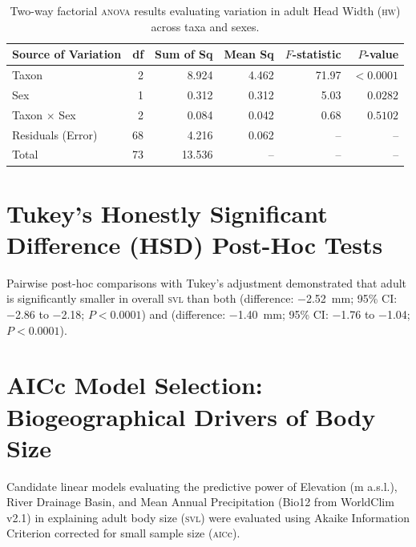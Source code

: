 \begin{table}[htbp]
  \centering
  \small
  \caption{Two-way factorial \textsc{anova} results evaluating variation in adult Head Width (\textsc{hw}) across taxa and sexes.}
  \label{tab:anova_hw}
  \begin{tabular}{lrrrrr}
    \toprule
    \textbf{Source of Variation} & \textbf{df} & \textbf{Sum of Sq} & \textbf{Mean Sq} & \textbf{$F$-statistic} & \textbf{$P$-value} \\
    \midrule
    Taxon & 2 & 8.924 & 4.462 & 71.97 & $< 0.0001$ \\
    Sex & 1 & 0.312 & 0.312 & 5.03 & $0.0282$ \\
    Taxon $\times$ Sex & 2 & 0.084 & 0.042 & 0.68 & $0.5102$ \\
    Residuals (Error) & 68 & 4.216 & 0.062 & -- & -- \\
    \midrule
    Total & 73 & 13.536 & -- & -- & -- \\
    \bottomrule
  \end{tabular}
\end{table}

\section{Tukey's Honestly Significant Difference (HSD) Post-Hoc Tests}

Pairwise post-hoc comparisons with Tukey's adjustment demonstrated that adult  is significantly smaller in overall \textsc{svl} than both  (difference: \SI{-2.52}{\milli\metre}; 95\% CI: \num{-2.86} to \num{-2.18}; $P < 0.0001$) and  (difference: \SI{-1.40}{\milli\metre}; 95\% CI: \num{-1.76} to \num{-1.04}; $P < 0.0001$).

\section{AICc Model Selection: Biogeographical Drivers of Body Size}

Candidate linear models evaluating the predictive power of Elevation (m a.s.l.), River Drainage Basin, and Mean Annual Precipitation (Bio12 from WorldClim v2.1) in explaining adult body size (\textsc{svl}) were evaluated using Akaike Information Criterion corrected for small sample size (\textsc{aic}c).

